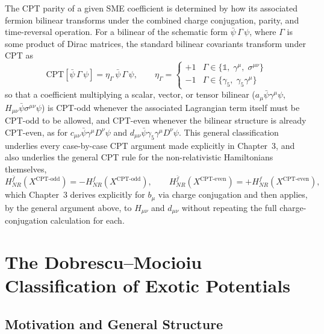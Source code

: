 \documentclass[main]{subfiles}
\begin{document}
The CPT parity of a given SME coefficient is determined by how its
associated fermion bilinear transforms under the combined charge
conjugation, parity, and time-reversal operation. For a bilinear of the
schematic form $\bar\psi\,\Gamma\,\psi$, where $\Gamma$ is some product of
Dirac matrices, the standard bilinear covariants transform under CPT as
\begin{equation}
  \mathrm{CPT}\!\left[\bar\psi\,\Gamma\,\psi\right]
  = \eta_\Gamma\,\bar\psi\,\Gamma\,\psi,
  \qquad
  \eta_\Gamma = \begin{cases}
    +1 & \Gamma \in \{\mathbb 1,\; \gamma^\mu,\; \sigma^{\mu\nu}\} \\
    -1 & \Gamma \in \{\gamma_5,\; \gamma_5\gamma^\mu\}
  \end{cases}
\end{equation}
so that a coefficient multiplying a scalar, vector, or tensor bilinear
($a_\mu\bar\psi\gamma^\mu\psi$, $H_{\mu\nu}\bar\psi\sigma^{\mu\nu}\psi$) is
CPT-odd whenever the associated Lagrangian term itself must be CPT-odd to
be allowed, and CPT-even whenever the bilinear structure is already
CPT-even, as for $c_{\mu\nu}\bar\psi\gamma^\mu D^\nu\psi$ and
$d_{\mu\nu}\bar\psi\gamma_5\gamma^\mu D^\nu\psi$. This general classification
underlies every case-by-case CPT argument made explicitly in Chapter~3, and
also underlies the general CPT rule for the non-relativistic Hamiltonians
themselves,
\begin{equation}
  H_{NR}^{\bar f}\!\left(X^{\text{CPT-odd}}\right)  = -H_{NR}^{f}\!\left(X^{\text{CPT-odd}}\right),
  \qquad
  H_{NR}^{\bar f}\!\left(X^{\text{CPT-even}}\right) = +H_{NR}^{f}\!\left(X^{\text{CPT-even}}\right),
  \label{eq:cpt-rule-general}
\end{equation}
which Chapter~3 derives explicitly for $b_\mu$ via charge conjugation and
then applies, by the general argument above, to $H_{\mu\nu}$ and
$d_{\mu\nu}$ without repeating the full charge-conjugation calculation for
each.

\section{The Dobrescu--Mocioiu Classification of Exotic Potentials}
\label{sec:dm}

\subsection{Motivation and General Structure}
\end{document}
